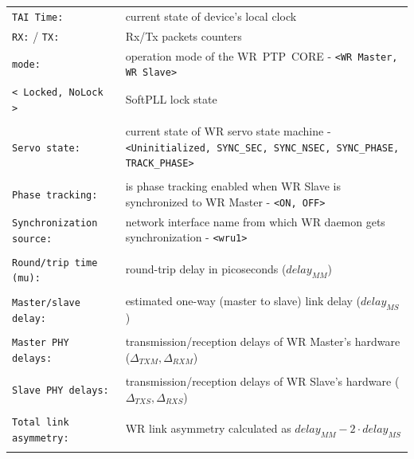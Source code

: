\documentclass[a4paper, 12pt]{article}
\newcommand{\code}[1]{\texttt{#1}}
\newcommand{\codeHook}[1]{\mbox{\ttfamily\MakeTextUppercase{#1}}}
\begin{document}
\footnotesize
\begin{longtable}{  p{4.5cm}  p{10cm} }

  \code{TAI Time:} & current state of device's local clock \\

  \code{RX:} / \code{TX:} & Rx/Tx packets counters\\

  \code{mode:} & operation mode of the \codeHook{wr ptp core} - \code{<WR Master, WR Slave>}\\

  \code{< Locked, NoLock >} & SoftPLL lock state\\
 & \\

  \code{Servo state:} & current state of \codeHook{wr} servo state machine -
\code{<Uninitialized, SYNC\_SEC, SYNC\_NSEC, SYNC\_PHASE, TRACK\_PHASE>}\\
 & \\

  \code{Phase tracking:} & is phase tracking enabled when \codeHook{wr} Slave is
synchronized to \codeHook{wr} Master - \code{<ON, OFF>}\\

  \code{Synchronization source:} & network interface name from which \codeHook{wr}
daemon gets synchronization - \code{<wru1>}\\
 & \\

  \code{Round\-/trip time (mu):} & round-trip delay in picoseconds
(\( delay_{MM} \))\\
 & \\

  \code{Master\-/slave delay:} & estimated one-way (master to slave) link
delay (\( delay_{MS} \))\\
 & \\

  \code{Master PHY delays:} & transmission/reception delays of \codeHook{wr}
Master's hardware (\( \Delta_{TXM}, \Delta_{RXM} \))\\
 & \\

  \code{Slave PHY delays:} & transmission/reception delays of \codeHook{wr} Slave's
hardware (\( \Delta_{TXS}, \Delta_{RXS} \))\\
 & \\

  \code{Total link asymmetry:} & \codeHook{wr} link asymmetry calculated as
\( delay_{MM} - 2 \cdot delay_{MS} \)\\
 & \\


\end{longtable}
\end{document}
